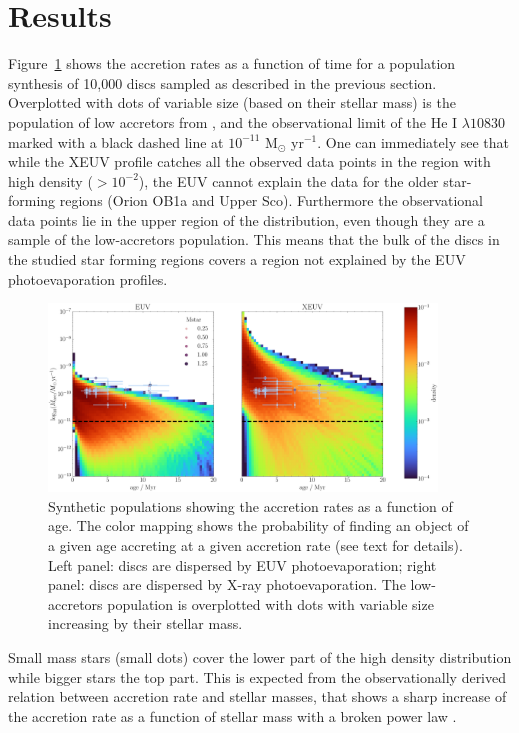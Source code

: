 \documentclass[fleqn,usenatbib,letters]{mnras}
\begin{document}
\section{Results}\label{sec:results}

Figure~\ref{fig:mdot_age} shows the accretion rates as a function of time for a population synthesis of 10,000 discs sampled as described in the previous section.
Overplotted with dots of variable size (based on their stellar mass) is the population of low accretors from \citet{Thanathibodee2023}, and the observational limit of the He I $\lambda10830$ marked with a black dashed line at $10^{-11}$ M$_\odot$ yr$^{-1}$.
One can immediately see that while the XEUV profile catches all the observed data points in the region with high density ($> 10^{-2}$), the EUV cannot explain the data for the older star-forming regions (Orion OB1a and Upper Sco). Furthermore the observational data points lie in the upper region of the distribution, even though they are a sample of the low-accretors population. This means that the bulk of the discs in the studied star forming regions covers a region not explained by the EUV photoevaporation profiles.
\begin{figure}
    \includegraphics[width=0.92\textwidth]{Fig6}
    \caption{Synthetic populations showing the accretion rates as a function of age. The color mapping shows the probability of finding an object of a given age accreting at a given accretion rate (see text for details). Left panel: discs are dispersed by EUV photoevaporation; right panel: discs are dispersed by X-ray photoevaporation. The low-accretors population is overplotted with dots with variable size increasing by their stellar mass.
    \label{fig:mdot_age}}
\end{figure}

Small mass stars (small dots) cover the lower part of the high density distribution while bigger stars the top part. This is expected from the observationally derived relation between accretion rate and stellar masses, that shows a sharp increase of the accretion rate as a function of stellar mass with a broken power law \citep{Alcala2017}.
\end{document}
